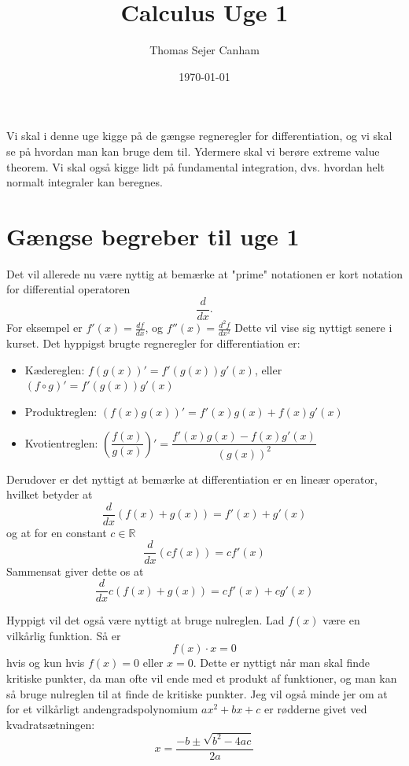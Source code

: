 \documentclass{article}
\title{Calculus Uge 1}
\author{Thomas Sejer Canham}
\date{\today}
\theoremstyle{definition}
\theoremstyle{remark}
\begin{document}

\begin{titlepage}

    \maketitle
    \thispagestyle{empty}

\end{titlepage}
Vi skal i denne uge kigge på de gængse regneregler for differentiation, og vi skal se på hvordan man kan bruge dem til. Ydermere skal vi berøre extreme value theorem. Vi skal også kigge lidt på fundamental integration, dvs. hvordan helt normalt integraler kan beregnes. 
\section*{Gængse begreber til uge 1}
Det vil allerede nu være nyttig at bemærke at "prime" notationen er kort notation for differential operatoren
 $$\frac{d}{dx}.$$ For eksempel er $f'(x) = \frac{df}{dx}$, og $f''(x) = \frac{d^2f}{dx^2}$ Dette vil vise sig nyttigt senere i kurset. Det hyppigst brugte regneregler for differentiation er:

\begin{itemize}
    \item Kædereglen: $f(g(x))' = f'(g(x))  g'(x)$, eller $(f \circ g)' = f'(g(x))  g'(x)$
    
    \item Produktreglen: $(f(x)  g(x))' = f'(x)  g(x) + f(x)  g'(x)$

    \item Kvotientreglen: $\left(\dfrac{f(x)}{g(x)}\right)' = \dfrac{f'(x)  g(x) - f(x)  g'(x)}{(g(x))^2}$
\end{itemize}
Derudover er det nyttigt at bemærke at differentiation er en lineær operator, hvilket betyder at
$$\frac{d}{dx}(f(x) + g(x)) = f'(x) + g'(x)$$
og at for en constant $c \in \mathbb{R}$
$$\frac{d}{dx}(c f(x)) = c  f'(x)$$
Sammensat giver dette os at
$$\frac{d}{dx}c( f(x) + g(x)) = c  f'(x) + c g'(x)$$

Hyppigt vil det også være nyttigt at bruge nulreglen. Lad $f(x)$ være en vilkårlig funktion. Så er 
$$f(x)\cdot x = 0$$
hvis og kun hvis $f(x) = 0$ eller $x = 0$. Dette er nyttigt når man skal finde kritiske punkter, da man ofte vil ende med et produkt af funktioner, og man kan så bruge nulreglen til at finde de kritiske punkter.\vspace{.5cm}
Jeg vil også minde jer om at for et vilkårligt andengradspolynomium $ax^2 + bx + c$ er rødderne givet ved kvadratsætningen:
$$x = \frac{-b \pm \sqrt{b^2 - 4ac}}{2a}$$
\end{document}
